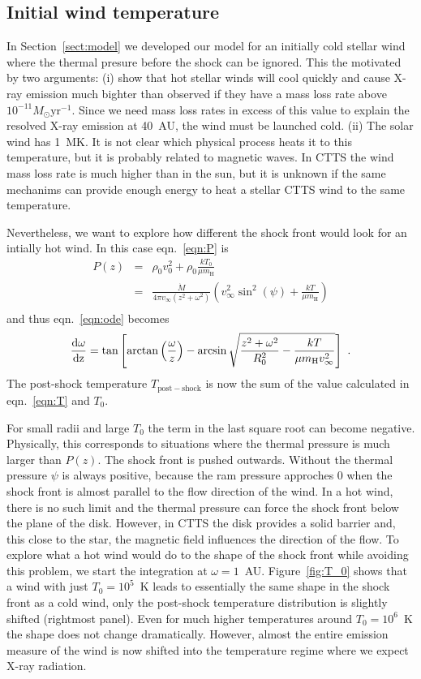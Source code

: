 \subsection{Initial wind temperature}
\label{sect:T_0}
In Section~\ref{sect:model} we developed our model for an initially cold stellar wind where the thermal presure before the shock can be ignored. This the motivated by two arguments: (i) \citet{2007IAUS..243..299M} show that hot stellar winds will cool quickly and cause X-ray emission much bighter than observed if they have a mass loss rate above $10^{-11}M_\odot\mathrm{ yr}^{-1}$. Since we need mass loss rates in excess of this value to explain the resolved X-ray emission at 40~AU, the wind must be launched cold. (ii) The solar wind has 1~MK. It is not clear which physical process heats it to this temperature, but it is probably related to magnetic waves. In CTTS the wind mass loss rate is much higher than in the sun, but it is unknown if the same mechanims can provide enough energy to heat a stellar CTTS wind to the same temperature.

Nevertheless, we want to explore how different the shock front would look for an intially hot wind.
In this case eqn.~\ref{eqn:P} is
\begin{eqnarray}
P(z) & = & \rho_0 v_0^2 + \rho_0 \frac{k T_0}{\mu m_{\textrm{H}}} \nonumber\\ 
     & = & \frac{\dot{M}}{4\pi v_{\infty}(z^2+\omega^2)} \left( v_{\infty}^2 \sin^2(\psi) + \frac{kT}{\mu m_{\textrm{H}}}\right)\\
\end{eqnarray}
and thus eqn.~\ref{eqn:ode} becomes
\begin{equation}
\frac{\rm{d}\omega}{\rm{d}z} = \tan\left[\arctan\left(\frac{\omega}{z}\right)-\arcsin\sqrt{\frac{z^2+\omega^2}{R_0^2}-\frac{kT}{\mu m_{\textrm{H}} v_{\infty}^2}}\right]\ .
\end{equation}
The post-shock temperature $T_{\mathrm{post-shock}}$ is now the sum of the value calculated in eqn.~\ref{eqn:T} and $T_0$.

For small radii and large $T_0$ the term in the last square root can become negative. Physically, this corresponds to situations where the thermal pressure is much larger than $P(z)$. The shock front is pushed outwards. Without the thermal pressure $\psi$ is always positive, because the ram pressure approches 0 when the shock front is almost parallel to the flow direction of the wind. In a hot wind, there is no such limit and the thermal pressure can force the shock front below the plane of the disk. However, in CTTS the disk provides a solid barrier and, this close to the star, the magnetic field influences the direction of the flow. To explore what a hot wind would do to the shape of the shock front while avoiding this problem, we start the integration at $\omega=1$~AU. Figure~\ref{fig:T_0} shows that a wind with just $T_0=10^5$~K leads to essentially the same shape in the shock front as a cold wind, only the post-shock temperature distribution is slightly shifted (rightmost panel). Even for much higher temperatures around $T_0=10^6$~K the shape does not change dramatically. However, almost the entire emission measure of the wind is now shifted into the temperature regime where we expect X-ray radiation.
